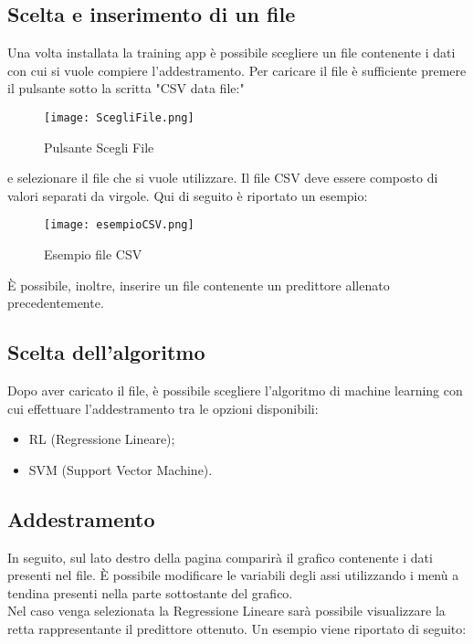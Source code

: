 \documentclass[../manuale-utente.tex]{subfiles}
\begin{document}
\subsection{Scelta e inserimento di un file}
\label{subs:scelta-e-inserimento}
Una volta installata la training app è possibile scegliere un file contenente i dati con cui si vuole compiere l'addestramento. Per caricare il file è sufficiente premere il pulsante sotto la scritta "CSV data file:"

\begin{figure}[h!]
  \begin{center}
    \texttt{[image: ScegliFile.png]}\\
    \caption{Pulsante Scegli File}%
    \label{fig:scegli-file}
  \end{center}
\end{figure}
e selezionare il file che si vuole utilizzare. Il file CSV deve essere composto di valori separati da virgole. Qui di seguito è riportato un esempio:

\begin{figure}[h!]
  \begin{center}
    \texttt{[image: esempioCSV.png]}\\
    \caption{Esempio file CSV}%
    \label{fig:esempioCSV}
  \end{center}
  \end{figure}

  È possibile, inoltre, inserire un file contenente un predittore allenato precedentemente.

\subsection{Scelta dell'algoritmo}
\label{subs:scelta-algoritmo}
Dopo aver caricato il file, è possibile scegliere l'algoritmo di machine learning con cui effettuare l'addestramento tra le opzioni disponibili:
\begin{itemize}
  \item RL (Regressione Lineare);
  \item SVM (Support Vector Machine).
\end{itemize}

\newpage
\subsection{Addestramento}
\label{subs:addestramento}

In seguito, sul lato destro della pagina comparirà il grafico contenente i dati presenti nel file. È possibile modificare le variabili degli assi utilizzando i menù a tendina presenti nella parte sottostante del grafico.\\
Nel caso venga selezionata la Regressione Lineare sarà possibile visualizzare la retta rappresentante il predittore ottenuto. Un esempio viene riportato di seguito:
\end{document}
